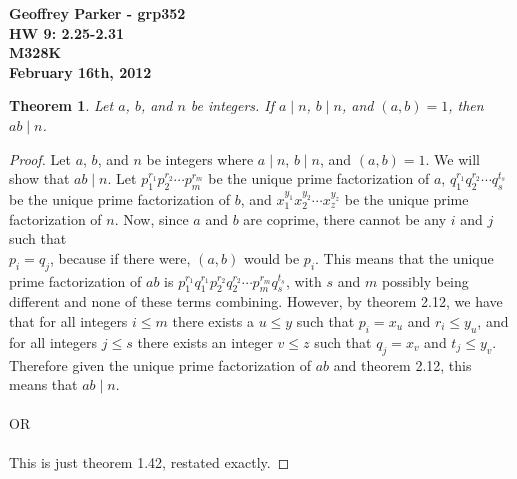 \documentclass[12pt,leqno]{article}
\numberwithin{equation}{section}
\newtheorem{thm}{Theorem}[section]
\theoremstyle{definition}
\begin{document}
\thispagestyle{plain}
\begin{flushright}
\large{\textbf{Geoffrey Parker - grp352 \\
HW 9: 2.25-2.31\\
M328K \\
February 16th, 2012 \\}}
\end{flushright}

\markboth{}{} \setcounter{section}{0} \baselineskip=18pt

\setcounter{tocdepth}{4}



\setcounter{section}{2}

\setcounter{thm}{24}


\begin{thm}
Let $a$, $b$, and $n$ be integers.  If $a \mid n$, $b \mid n$, and $(a, b) = 1$, then $ab \mid n$.
\end{thm}

\begin{proof}[Proof]
Let $a$, $b$, and $n$ be integers where $a \mid n$, $b \mid n$, and $(a, b) = 1$. We will show that $ab \mid n$.  
Let $p_1^{r_1}p_2^{r_2}\cdots p_m^{r_m}$ be the unique prime factorization of $a$, $q_1^{r_1}q_2^{r_2}\cdots q_s^{t_s}$ be the unique prime factorization of $b$, and $x_1^{y_1}x_2^{y_2}\cdots x_z^{y_z}$ be the unique prime factorization of $n$.  Now, since $a$ and $b$ are coprime, there cannot be any $i$ and $j$ such that \\$p_i = q_j$, because if there were, $(a, b)$ would be $p_i$.  This means that the unique prime factorization of $ab$ is $p_1^{r_1}q_1^{r_1}p_2^{r_2}q_2^{r_2}\cdots p_m^{r_m}q_s^{t_s}$, with $s$ and $m$ possibly being different and none of these terms combining.  However, by theorem 2.12, we have that for all integers $i \leq m$ there exists a $u \leq y$ such that $p_i = x_u$ and $r_i \leq y_u$, and for all integers $j \leq s$ there exists an integer $v \leq z$ such that $q_j = x_v$ and $t_j \leq y_v$.  Therefore given the unique prime factorization of $ab$ and theorem 2.12, this means that $ab \mid n$.
\\ \\
OR
\\ \\
This is just theorem 1.42, restated exactly.
\end{proof}
\end{document}
